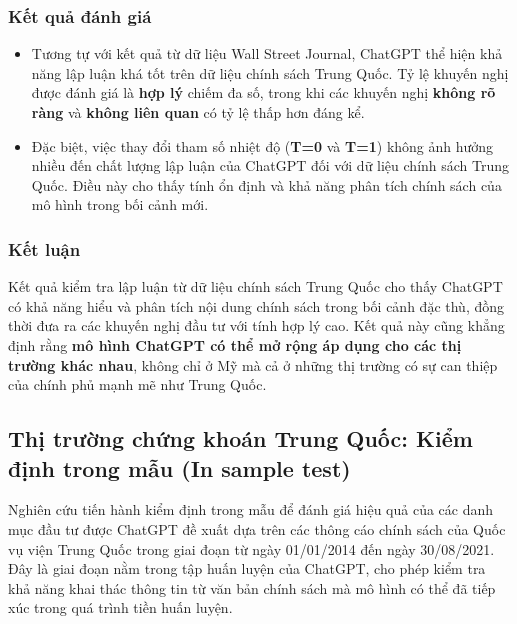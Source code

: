 \documentclass[a4paper,12pt]{article}
\begin{document}
\subsubsection{Kết quả đánh giá}
\begin{itemize}
    \item Tương tự với kết quả từ dữ liệu Wall Street Journal, ChatGPT thể hiện khả năng lập luận khá tốt trên dữ liệu chính sách Trung Quốc. Tỷ lệ khuyến nghị được đánh giá là \textbf{hợp lý} chiếm đa số, trong khi các khuyến nghị \textbf{không rõ ràng} và \textbf{không liên quan} có tỷ lệ thấp hơn đáng kể.
    \item Đặc biệt, việc thay đổi tham số nhiệt độ (\textbf{T=0} và \textbf{T=1}) không ảnh hưởng nhiều đến chất lượng lập luận của ChatGPT đối với dữ liệu chính sách Trung Quốc. Điều này cho thấy tính ổn định và khả năng phân tích chính sách của mô hình trong bối cảnh mới.
\end{itemize}

\subsubsection{Kết luận}
Kết quả kiểm tra lập luận từ dữ liệu chính sách Trung Quốc cho thấy ChatGPT có khả năng hiểu và phân tích nội dung chính sách trong bối cảnh đặc thù, đồng thời đưa ra các khuyến nghị đầu tư với tính hợp lý cao. Kết quả này cũng khẳng định rằng \textbf{mô hình ChatGPT có thể mở rộng áp dụng cho các thị trường khác nhau}, không chỉ ở Mỹ mà cả ở những thị trường có sự can thiệp của chính phủ mạnh mẽ như Trung Quốc.

\subsection{Thị trường chứng khoán Trung Quốc: Kiểm định trong mẫu (In sample test)}

Nghiên cứu tiến hành kiểm định trong mẫu để đánh giá hiệu quả của các danh mục đầu tư được ChatGPT đề xuất dựa trên các thông cáo chính sách của Quốc vụ viện Trung Quốc trong giai đoạn từ ngày 01/01/2014 đến ngày 30/08/2021. Đây là giai đoạn nằm trong tập huấn luyện của ChatGPT, cho phép kiểm tra khả năng khai thác thông tin từ văn bản chính sách mà mô hình có thể đã tiếp xúc trong quá trình tiền huấn luyện.
\end{document}
